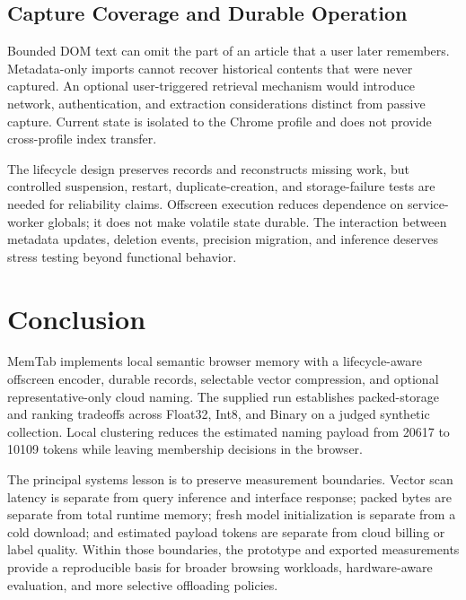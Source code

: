 \documentclass[conference]{IEEEtran}
\newcommand{\mFullTokens}{20617}
\newcommand{\mPrunedTokens}{10109}
\begin{document}
\subsection{Capture Coverage and Durable Operation}
Bounded DOM text can omit the part of an article that a user later remembers.
Metadata-only imports cannot recover historical contents that were never
captured. An optional user-triggered retrieval mechanism would introduce
network, authentication, and extraction considerations distinct from passive
capture. Current state is isolated to the Chrome profile and does not provide
cross-profile index transfer.

The lifecycle design preserves records and reconstructs missing work, but
controlled suspension, restart, duplicate-creation, and storage-failure tests
are needed for reliability claims. Offscreen execution reduces dependence on
service-worker globals; it does not make volatile state durable. The
interaction between metadata updates, deletion events, precision migration,
and inference deserves stress testing beyond functional behavior.

\section{Conclusion}
MemTab implements local semantic browser memory with a lifecycle-aware
offscreen encoder, durable records, selectable vector compression, and
optional representative-only cloud naming. The supplied run establishes
packed-storage and ranking tradeoffs across Float32, Int8, and Binary on a
judged synthetic collection. Local clustering reduces the estimated naming
payload from \mFullTokens{} to \mPrunedTokens{} tokens while leaving membership
decisions in the browser.

The principal systems lesson is to preserve measurement boundaries. Vector
scan latency is separate from query inference and interface response;
packed bytes are separate from total runtime memory; fresh model
initialization is separate from a cold download; and estimated payload tokens
are separate from cloud billing or label quality. Within those boundaries,
the prototype and exported measurements provide a reproducible basis for
broader browsing workloads, hardware-aware evaluation, and more selective
offloading policies.



\end{document}
